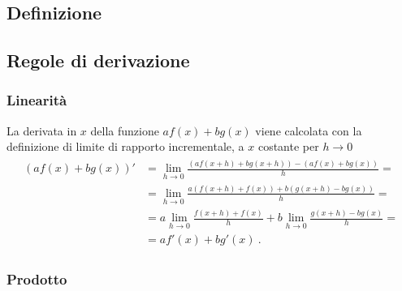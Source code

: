 \documentclass[letterpaper,10pt,italian]{jupyterBook}
\begin{document}
\subsection{Definizione}
\label{\detokenize{ch/infinitesimal_calculus/derivatives-notes:definizione}}\label{\detokenize{ch/infinitesimal_calculus/derivatives-notes:infinitesimal-calculus-derivatives-def-notes}}

\subsection{Regole di derivazione}
\label{\detokenize{ch/infinitesimal_calculus/derivatives-notes:regole-di-derivazione}}\label{\detokenize{ch/infinitesimal_calculus/derivatives-notes:infinitesimal-calculus-derivatives-rules-notes}}\subsubsection*{Linearità}

\sphinxAtStartPar
La derivata in \(x\) della funzione \(a f(x) + b g(x)\) viene calcolata con la definizione di limite di rapporto incrementale, a \(x\) costante per \(h \rightarrow 0\)
\begin{equation*}
\begin{split}\begin{aligned}
  \left( a f(x) + b g(x) \right)' 
  & = \lim_{h \rightarrow 0} \frac{( a f(x+h) + b g(x+h) ) - ( a f(x) + b g(x) ) }{h} = \\
  & = \lim_{h \rightarrow 0} \frac{a ( f(x+h) + f(x) ) + b ( g(x+h) -  b g(x) )}{h} = \\
  & = a \lim_{h \rightarrow 0} \frac{f(x+h) + f(x)}{h} + b \lim_{h \rightarrow 0} \frac{ g(x+h) -  b g(x) }{h} = \\
  & = a f'(x) + b g'(x) \ .
\end{aligned}\end{split}
\end{equation*}\subsubsection*{Prodotto}
\end{document}
